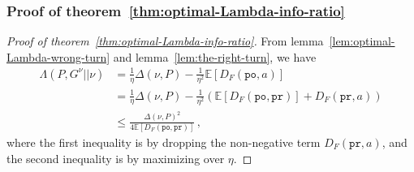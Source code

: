 \documentclass{article}
\theoremstyle{plain}
\theoremstyle{definition}
\newcommand{\pr}{\texttt{pr}}
\newcommand{\po}{\texttt{po}}
\newcommand{\E}{\mathbb E}
\begin{document}
\subsubsection{Proof of theorem~\ref{thm:optimal-Lambda-info-ratio}}
\label{proof:thm:optimal-Lambda-info-ratio}
\begin{proof}[Proof of theorem~\ref{thm:optimal-Lambda-info-ratio}]
    From lemma~\ref{lem:optimal-Lambda-wrong-turn} and lemma~\ref{lem:the-right-turn}, we have
    \begin{align*}
        \Lambda(P, G^\nu|| \nu)
         & = \frac{1}{\eta} \Delta(\nu, P)
        - \frac{1}{\eta^2}
        \E\!\left[
            D_F\left(\po, a\right)
        \right]                            \\
         & = \frac{1}{\eta} \Delta(\nu, P)
        - \frac{1}{\eta^2}
        \left(
        \E\left[
                D_F\left( \po, \pr\right)
                \right]
        +
        D_F\left( \pr, a\right)
        \right)                            \\
         & \leq \frac{
            \Delta(\nu, P)^2
        }{
            4 \E\left[D_F\left( \po, \pr\right)\right]
        }\,,
    \end{align*}
    where the first inequality is by dropping the non-negative term $D_F( \pr, a)$,
    and the second inequality is by maximizing over $\eta$.
\end{proof}
\end{document}
